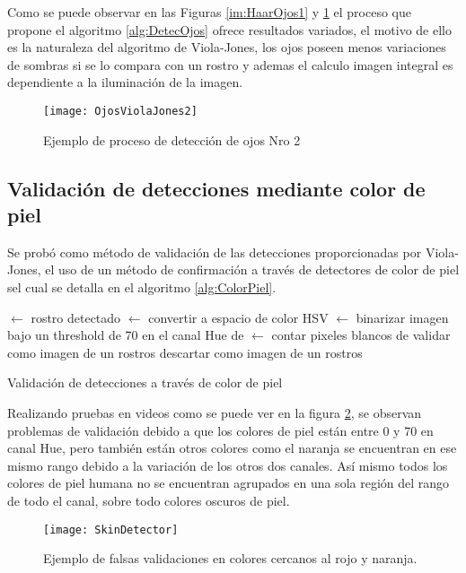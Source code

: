 Como se puede observar en las Figuras \ref{im:HaarOjos1} y \ref{im:HaarOjos2} el proceso que propone el algoritmo \ref{alg:DetecOjos} ofrece resultados variados, el motivo de ello es la naturaleza del algoritmo de Viola-Jones, los ojos poseen menos variaciones de sombras si se lo compara con un rostro y ademas el calculo imagen integral es dependiente a la iluminación de la imagen.

\begin{figure}[h]
	\centering
    \texttt{[image: OjosViolaJones2]}
    \caption{Ejemplo de proceso de detección de ojos Nro 2}
    \label{im:HaarOjos2}
\end{figure}

\subsection{Validación de detecciones mediante color de piel}
Se probó como método de validación de las detecciones proporcionadas por Viola-Jones, el uso de un método de confirmación a través de detectores de color de piel sel cual se detalla en el algoritmo \ref{alg:ColorPiel}.

\begin{algorithm}[h]
 $\gets$ rostro detectado\;
 $\gets$ convertir  a espacio de color HSV\;
 $\gets$ binarizar imagen bajo un threshold de 70 en el canal Hue de \;
 $\gets$ contar pixeles blancos de \;
{
	validar  como imagen de un rostros\;
}
{
	descartar  como imagen de un rostros\;
}
\caption{Validación de detecciones a través de color de piel}
\label{alg:ColorPiel}
\end{algorithm}

Realizando pruebas en videos como se puede ver en la figura \ref{im:skinDetector}, se observan problemas de validación debido a que los colores de piel están entre 0 y 70 en canal Hue, pero también están otros colores como el naranja se encuentran en ese mismo rango debido a la variación de los otros dos canales. Así mismo todos los colores de piel humana no se encuentran agrupados en una sola región del rango de todo el canal, sobre todo colores oscuros de piel.
\begin{figure}[h]
	\centering
    \texttt{[image: SkinDetector]}
    \caption{Ejemplo de falsas validaciones en colores cercanos al rojo y naranja.}
    \label{im:skinDetector}
\end{figure}

